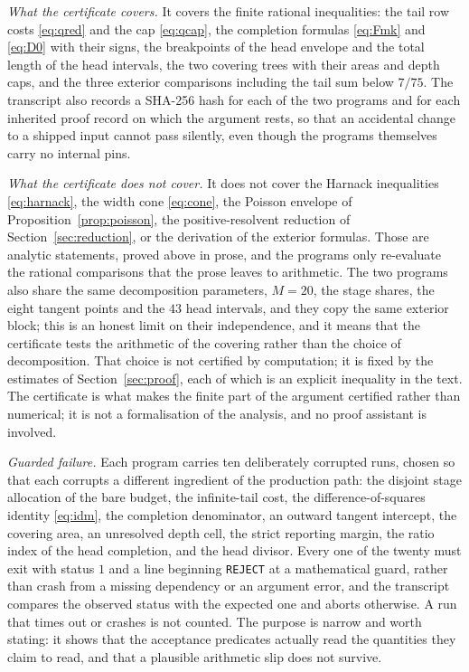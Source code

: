 \documentclass[10pt]{article}
\theoremstyle{remark}
\begin{document}
\emph{What the certificate covers.} It covers the finite rational inequalities: the tail row costs \eqref{eq:qred} and the cap \eqref{eq:qcap}, the completion formulas \eqref{eq:Fmk} and \eqref{eq:D0} with their signs, the breakpoints of the head envelope and the total length of the head intervals, the two covering trees with their areas and depth caps, and the three exterior comparisons including the tail sum below $7/75$. The transcript also records a SHA-256 hash for each of the two programs and for each inherited proof record on which the argument rests, so that an accidental change to a shipped input cannot pass silently, even though the programs themselves carry no internal pins.

\emph{What the certificate does not cover.} It does not cover the Harnack inequalities \eqref{eq:harnack}, the width cone \eqref{eq:cone}, the Poisson envelope of Proposition~\ref{prop:poisson}, the positive-resolvent reduction of Section~\ref{sec:reduction}, or the derivation of the exterior formulas. Those are analytic statements, proved above in prose, and the programs only re-evaluate the rational comparisons that the prose leaves to arithmetic. The two programs also share the same decomposition parameters, $M=20$, the stage shares, the eight tangent points and the $43$ head intervals, and they copy the same exterior block; this is an honest limit on their independence, and it means that the certificate tests the arithmetic of the covering rather than the choice of decomposition. That choice is not certified by computation; it is fixed by the estimates of Section~\ref{sec:proof}, each of which is an explicit inequality in the text. The certificate is what makes the finite part of the argument certified rather than numerical; it is not a formalisation of the analysis, and no proof assistant is involved.

\emph{Guarded failure.} Each program carries ten deliberately corrupted runs, chosen so that each corrupts a different ingredient of the production path: the disjoint stage allocation of the bare budget, the infinite-tail cost, the difference-of-squares identity \eqref{eq:idm}, the completion denominator, an outward tangent intercept, the covering area, an unresolved depth cell, the strict reporting margin, the ratio index of the head completion, and the head divisor. Every one of the twenty must exit with status $1$ and a line beginning \texttt{REJECT} at a mathematical guard, rather than crash from a missing dependency or an argument error, and the transcript compares the observed status with the expected one and aborts otherwise. A run that times out or crashes is not counted. The purpose is narrow and worth stating: it shows that the acceptance predicates actually read the quantities they claim to read, and that a plausible arithmetic slip does not survive.
\end{document}
